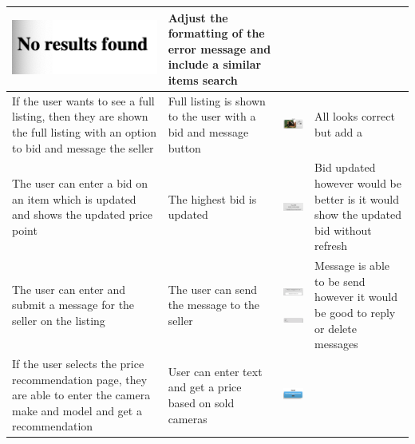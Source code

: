 \begin{center}
\begin{longtable}{|P{30mm}|P{20mm}|P{60mm}|P{25mm}|}
\includegraphics[width=57mm]{ch4_testing_for_eval/media/image32.png}
& Adjust the formatting of the error message and include a similar items
search \\ \hline
If the user wants to see a full listing, then they are shown the full
listing with an option to bid and message the seller & Full listing is
shown to the user with a bid and message button &
\includegraphics[width=57mm]{ch4_testing_for_eval/media/image33.png}
& All looks correct but add a \\ \hline
The user can enter a bid on an item which is updated and shows the
updated price point & The highest bid is updated &
\includegraphics[width=57mm]{ch4_testing_for_eval/media/image34.png}
& Bid updated however would be better is it would show the updated bid
without refresh \\ \hline
The user can enter and submit a message for the seller on the listing &
The user can send the message to the seller &
\includegraphics[width=57mm]{ch4_testing_for_eval/media/image37.png}

\includegraphics[width=57mm]{ch4_testing_for_eval/media/image38.png}
& Message is able to be send however it would be good to reply or delete
messages \\ \hline
If the user selects the price recommendation page, they are able to
enter the camera make and model and get a recommendation & User can
enter text and get a price based on sold cameras &
\includegraphics[width=57mm]{ch4_testing_for_eval/media/image49.png}


\end{longtable}
\end{center}
